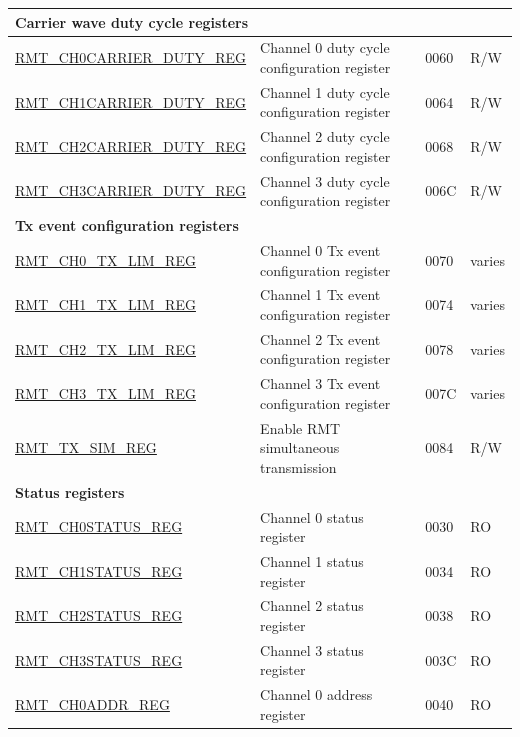 \begin{longtable}{ | p{5.5cm} | p{7cm} | p{1.5cm} | p{1cm} | }
\multicolumn{4}{|l|}{\textbf{Carrier wave duty cycle registers}} \\ \hline
\hyperref[regdesc:RMTCHNCARRIERDUTYREG]{RMT\_CH0CARRIER\_DUTY\_REG} & Channel 0 duty cycle configuration register & \hexprefix{}0060 & R/W \\ \hline
\hyperref[regdesc:RMTCHNCARRIERDUTYREG]{RMT\_CH1CARRIER\_DUTY\_REG} & Channel 1 duty cycle configuration register & \hexprefix{}0064 & R/W \\ \hline
\hyperref[regdesc:RMTCHNCARRIERDUTYREG]{RMT\_CH2CARRIER\_DUTY\_REG} & Channel 2 duty cycle configuration register & \hexprefix{}0068 & R/W \\ \hline
\hyperref[regdesc:RMTCHNCARRIERDUTYREG]{RMT\_CH3CARRIER\_DUTY\_REG} & Channel 3 duty cycle configuration register & \hexprefix{}006C & R/W \\ \hline
\multicolumn{4}{|l|}{\textbf{Tx event configuration registers}} \\ \hline
\hyperref[regdesc:RMTCHNTXLIMREG]{RMT\_CH0\_TX\_LIM\_REG} & Channel 0 Tx event configuration register & \hexprefix{}0070 & varies \\ \hline
\hyperref[regdesc:RMTCHNTXLIMREG]{RMT\_CH1\_TX\_LIM\_REG} & Channel 1 Tx event configuration register & \hexprefix{}0074 & varies \\ \hline
\hyperref[regdesc:RMTCHNTXLIMREG]{RMT\_CH2\_TX\_LIM\_REG} & Channel 2 Tx event configuration register & \hexprefix{}0078 & varies \\ \hline
\hyperref[regdesc:RMTCHNTXLIMREG]{RMT\_CH3\_TX\_LIM\_REG} & Channel 3 Tx event configuration register & \hexprefix{}007C & varies \\ \hline
\hyperref[regdesc:RMTTXSIMREG]{RMT\_TX\_SIM\_REG} & Enable RMT simultaneous transmission & \hexprefix{}0084 & R/W \\ \hline
\multicolumn{4}{|l|}{\textbf{Status registers}} \\ \hline
\hyperref[regdesc:RMTCHNSTATUSREG]{RMT\_CH0STATUS\_REG} & Channel 0 status register & \hexprefix{}0030 & RO \\ \hline
\hyperref[regdesc:RMTCHNSTATUSREG]{RMT\_CH1STATUS\_REG} & Channel 1 status register & \hexprefix{}0034 & RO \\ \hline
\hyperref[regdesc:RMTCHNSTATUSREG]{RMT\_CH2STATUS\_REG} & Channel 2 status register & \hexprefix{}0038 & RO \\ \hline
\hyperref[regdesc:RMTCHNSTATUSREG]{RMT\_CH3STATUS\_REG} & Channel 3 status register & \hexprefix{}003C & RO \\ \hline
\hyperref[regdesc:RMTCHNADDRREG]{RMT\_CH0ADDR\_REG} & Channel 0 address register & \hexprefix{}0040 & RO \\ \hline

\end{longtable}

